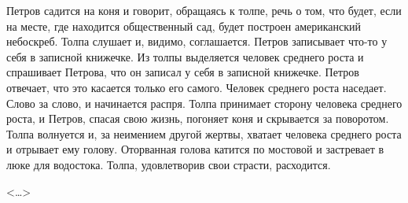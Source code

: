 Петров садится на коня и говорит, обращаясь к толпе, речь о том, что будет, если на месте, где находится общественный сад, будет построен американский небоскреб. Толпа слушает и, видимо, соглашается. Петров записывает что-то у себя в записной книжечке. Из толпы выделяется человек среднего роста и спрашивает Петрова, что он записал у себя в записной книжечке. Петров отвечает, что это касается только его самого. Человек среднего роста наседает. Слово за слово, и начинается распря. Толпа принимает сторону человека среднего роста, и Петров, спасая свою жизнь, погоняет коня и скрывается за поворотом. Толпа волнуется и, за неимением другой жертвы, хватает человека среднего роста и отрывает ему голову. Оторванная голова катится по мостовой и застревает в люке для водостока. Толпа, удовлетворив свои страсти, расходится.

\begin{flushright} <\dots> \end{flushright}
